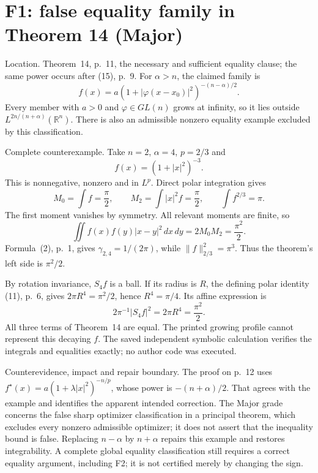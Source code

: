 \documentclass[10pt]{article}
\begin{document}
\section*{F1: false equality family in Theorem 14 (Major)}
Location. Theorem 14, p. 11, the necessary and sufficient equality clause; the same power occurs after (15), p. 9. For \(\alpha>n\), the claimed family is \[f(x)=a(1+|\varphi(x-x_0)|^2)^{-(n-\alpha)/2}.\] Every member with \(a>0\) and \(\varphi\in GL(n)\) grows at infinity, so it lies outside \(L^{2n/(n+\alpha)}(\mathbb R^n)\). There is also an admissible nonzero equality example excluded by this classification.\par
Complete counterexample. Take \(n=2\), \(\alpha=4\), \(p=2/3\) and \[f(x)=(1+|x|^2)^{-3}.\] This is nonnegative, nonzero and in \(L^p\). Direct polar integration gives \[M_0=\int f=\frac{\pi}{2},\qquad
 M_2=\int |x|^2f=\frac{\pi}{2},\qquad \int f^{2/3}=\pi.\] The first moment vanishes by symmetry. All relevant moments are finite, so \[\iint f(x)f(y)|x-y|^2\,dx\,dy=2M_0M_2=\frac{\pi^2}{2}.\] Formula (2), p. 1, gives \(\gamma_{2,4}=1/(2\pi)\), while \(\|f\|_{2/3}^2=\pi^3\). Thus the theorem’s left side is \(\pi^2/2\).\par
By rotation invariance, \(S_4f\) is a ball. If its radius is \(R\), the defining polar identity (11), p. 6, gives \(2\pi R^4=\pi^2/2\), hence \(R^4=\pi/4\). Its affine expression is \[2\pi^{-1}|S_4f|^2=2\pi R^4=\frac{\pi^2}{2}.\] All three terms of Theorem 14 are equal. The printed growing profile cannot represent this decaying \(f\). The saved independent symbolic calculation verifies the integrals and equalities exactly; no author code was executed.\par
Counterevidence, impact and repair boundary. The proof on p. 12 uses \(f^\star(x)=a(1+\lambda|x|^2)^{-n/p}\), whose power is \(-(n+\alpha)/2\). That agrees with the example and identifies the apparent intended correction. The Major grade concerns the false sharp optimizer classification in a principal theorem, which excludes every nonzero admissible optimizer; it does not assert that the inequality bound is false. Replacing \(n-\alpha\) by \(n+\alpha\) repairs this example and restores integrability. A complete global equality classification still requires a correct equality argument, including F2; it is not certified merely by changing the sign.\par
\end{document}
